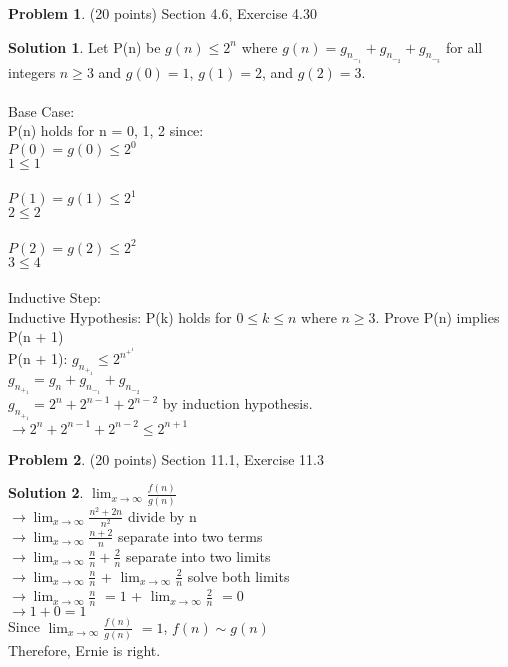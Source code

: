 \documentclass{article}
\theoremstyle{definition}
\newtheorem{problem}{Problem}
\newtheorem*{solution}{Solution}
\begin{document}
\begin{problem} (20 points) Section 4.6, Exercise 4.30
\end{problem}
\begin{solution} 
Let P(n) be $g(n) \leqslant 2^n$ where $g(n) = g_n_-_1 + g_n_-_2 + g_n_-_3$ for all integers $n \geqslant 3$ and $g(0) = 1$, $g(1) = 2$, and $g(2) = 3$. \\
\\
Base Case: \\
P(n) holds for n = 0, 1, 2 since: \\
$P(0) = g(0) \leqslant 2^0$ \\
$1 \leqslant 1$ \\
\\
$P(1) = g(1) \leqslant 2^1$ \\
$2 \leqslant 2$ \\
\\
$P(2) = g(2) \leqslant 2^2$ \\
$3 \leqslant 4$ \\
\\
Inductive Step: \\
Inductive Hypothesis: P(k) holds for $0 \leqslant k \leqslant n$ where $n \geqslant 3$. Prove P(n) implies P(n + 1) \\
P(n + 1): $g_n_+_1 \leqslant 2^n^+^1$ \\
$g_n_+_1 = g_n + g_n_-_1 + g_n_-_2$ \\
$g_n_+_1 = 2^n + 2^{n - 1} + 2^{n - 2}$ by induction hypothesis. \\
$\to 2^n + 2^{n - 1} + 2^{n - 2} \leqslant 2^{n + 1}$
\end{solution}

\begin{problem} (20 points) Section 11.1, Exercise 11.3
\end{problem}
\begin{solution} 
$\lim_{x\to\infty} \frac{f(n)}{g(n)}$ \\
$\to \lim_{x\to\infty} \frac{n^2 + 2n}{n^2}$ divide by n \\
$\to \lim_{x\to\infty} \frac{n + 2}{n}$ separate into two terms \\
$\to \lim_{x\to\infty} \frac{n}{n} + \frac{2}{n}$ separate into two limits \\
$\to \lim_{x\to\infty} \frac{n}{n}$ + $\lim_{x\to\infty} \frac{2}{n}$ solve both limits \\
$\to \lim_{x\to\infty} \frac{n}{n}$ $ = 1$ + $\lim_{x\to\infty} \frac{2}{n}$ $ = 0$ \\
$\to 1 + 0 = 1$ \\
Since $\lim_{x\to\infty} \frac{f(n)}{g(n)}$ $ = 1$, $f(n) \sim g(n)$ \\
Therefore, Ernie is right.
\end{solution}
\end{document}
